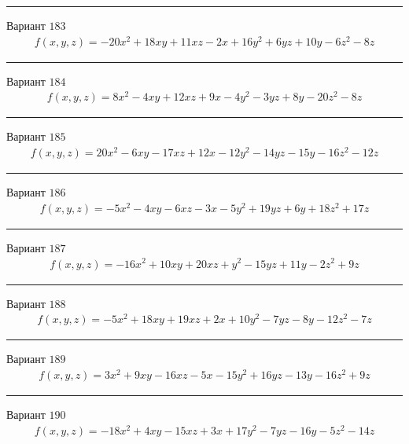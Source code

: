 \documentclass[11pt]{report}
\begin{document}
\begin{center}
\noindent\rule{8cm}{0.4pt}
\end{center}
Вариант $183$
\begin{align*}
    f(x, y, z) = - 20 x^{2} + 18 x y + 11 x z - 2 x + 16 y^{2} + 6 y z + 10 y - 6 z^{2} - 8 z
\end{align*}
\begin{center}
\noindent\rule{8cm}{0.4pt}
\end{center}
Вариант $184$
\begin{align*}
    f(x, y, z) = 8 x^{2} - 4 x y + 12 x z + 9 x - 4 y^{2} - 3 y z + 8 y - 20 z^{2} - 8 z
\end{align*}
\begin{center}
\noindent\rule{8cm}{0.4pt}
\end{center}
Вариант $185$
\begin{align*}
    f(x, y, z) = 20 x^{2} - 6 x y - 17 x z + 12 x - 12 y^{2} - 14 y z - 15 y - 16 z^{2} - 12 z
\end{align*}
\begin{center}
\noindent\rule{8cm}{0.4pt}
\end{center}
Вариант $186$
\begin{align*}
    f(x, y, z) = - 5 x^{2} - 4 x y - 6 x z - 3 x - 5 y^{2} + 19 y z + 6 y + 18 z^{2} + 17 z
\end{align*}
\begin{center}
\noindent\rule{8cm}{0.4pt}
\end{center}
Вариант $187$
\begin{align*}
    f(x, y, z) = - 16 x^{2} + 10 x y + 20 x z + y^{2} - 15 y z + 11 y - 2 z^{2} + 9 z
\end{align*}
\begin{center}
\noindent\rule{8cm}{0.4pt}
\end{center}
Вариант $188$
\begin{align*}
    f(x, y, z) = - 5 x^{2} + 18 x y + 19 x z + 2 x + 10 y^{2} - 7 y z - 8 y - 12 z^{2} - 7 z
\end{align*}
\begin{center}
\noindent\rule{8cm}{0.4pt}
\end{center}
Вариант $189$
\begin{align*}
    f(x, y, z) = 3 x^{2} + 9 x y - 16 x z - 5 x - 15 y^{2} + 16 y z - 13 y - 16 z^{2} + 9 z
\end{align*}
\begin{center}
\noindent\rule{8cm}{0.4pt}
\end{center}
Вариант $190$
\begin{align*}
    f(x, y, z) = - 18 x^{2} + 4 x y - 15 x z + 3 x + 17 y^{2} - 7 y z - 16 y - 5 z^{2} - 14 z
\end{align*}
\end{document}
